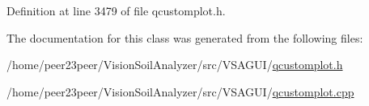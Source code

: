 Definition at line 3479 of file qcustomplot.\+h.



The documentation for this class was generated from the following files\+:\begin{DoxyCompactItemize}
\item 
/home/peer23peer/\+Vision\+Soil\+Analyzer/src/\+V\+S\+A\+G\+U\+I/\hyperlink{qcustomplot_8h}{qcustomplot.\+h}\item 
/home/peer23peer/\+Vision\+Soil\+Analyzer/src/\+V\+S\+A\+G\+U\+I/\hyperlink{qcustomplot_8cpp}{qcustomplot.\+cpp}\end{DoxyCompactItemize}

